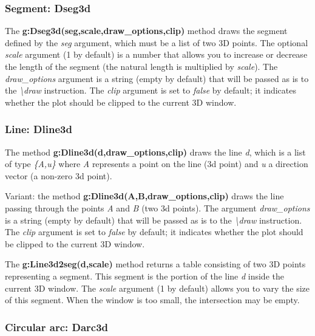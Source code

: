 \subsubsection{Segment: Dseg3d}

The \textbf{g:Dseg3d(seg,scale,draw\_options,clip)} method draws the segment defined by the \emph{seg} argument, which must be a list of two 3D points. The optional \emph{scale} argument (1 by default) is a number that allows you to increase or decrease the length of the segment (the natural length is multiplied by \emph{scale}). The \emph{draw\_options} argument is a string (empty by default) that will be passed as is to the \emph{\textbackslash draw} instruction. The \emph{clip} argument is set to \emph{false} by default; it indicates whether the plot should be clipped to the current 3D window.

    
\subsubsection{Line: Dline3d}

The method \textbf{g:Dline3d(d,draw\_options,clip)} draws the line \emph{d}, which is a list of type \emph{\{A,u\}} where \emph{A} represents a point on the line (3d point) and \emph{u} a direction vector (a non-zero 3d point).

Variant: the method \textbf{g:Dline3d(A,B,draw\_options,clip)} draws the line passing through the points \emph{A} and \emph{B} (two 3d points). The argument \emph{draw\_options} is a string (empty by default) that will be passed as is to the \emph{\textbackslash draw} instruction. The \emph{clip} argument is set to \emph{false} by default; it indicates whether the plot should be clipped to the current 3D window.

The \textbf{g:Line3d2seg(d,scale)} method returns a table consisting of two 3D points representing a segment. This segment is the portion of the line \emph{d} inside the current 3D window. The \emph{scale} argument (1 by default) allows you to vary the size of this segment. When the window is too small, the intersection may be empty.

\subsubsection{Circular arc: Darc3d}


